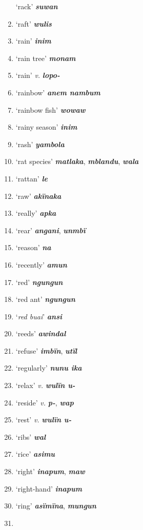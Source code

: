 \begin{enumerate}[noitemsep, label={}, align=left, widest=190, labelsep=1ex,leftmargin=*,itemindent=-10pt]
‘rack’ \textbf{\textit{suwan}} \item
‘raft’ \textbf{\textit{wulis}} \item
‘rain’ \textbf{\textit{inim}} \item
‘rain tree’ \textbf{\textit{monam}} \item
‘rain’ \textit{v.} \textbf{\textit{lopo-}} \item
‘rainbow’ \textbf{\textit{anem nambum}} \item
‘rainbow fish’ \textbf{\textit{wowaw}} \item
‘rainy season’ \textbf{\textit{inim}} \item
‘rash’ \textbf{\textit{yambola}} \item
‘rat species’ \textbf{\textit{matlaka}}, \textbf{\textit{mblandu}}, \textbf{\textit{wala}} \item
‘rattan’ \textbf{\textit{le}} \item
‘raw’ \textbf{\textit{akïnaka}} \item
‘really’ \textbf{\textit{apka}} \item
‘rear’ \textbf{\textit{angani}}, \textbf{\textit{unmbï}} \item
‘reason’ \textbf{\textit{na}} \item
‘recently’ \textbf{\textit{amun}} \item
‘red’ \textbf{\textit{ngungun}} \item
‘red ant’ \textbf{\textit{ngungun}} \item
‘\textit{red buai}’ \textbf{\textit{ansi}} \item
‘reeds’ \textbf{\textit{awindal}} \item
‘refuse’ \textbf{\textit{imbïn}}, \textbf{\textit{utïl}} \item
‘regularly’ \textbf{\textit{nunu ika}} \item
‘relax’ \textit{v.} \textbf{\textit{wulïn u-}} \item
‘reside’ \textit{v.} \textbf{\textit{p-}}, \textbf{\textit{wap}} \item
‘rest’ \textit{v.} \textbf{\textit{wulïn u-}} \item
‘ribs’ \textbf{\textit{wal}} \item
‘rice’ \textbf{\textit{asimu}} \item
‘right’ \textbf{\textit{inapum}}, \textbf{\textit{maw}} \item
‘right-hand’ \textbf{\textit{inapum}} \item
‘ring’ \textbf{\textit{asïmïna}}, \textbf{\textit{mungun}} \item

\end{enumerate}
